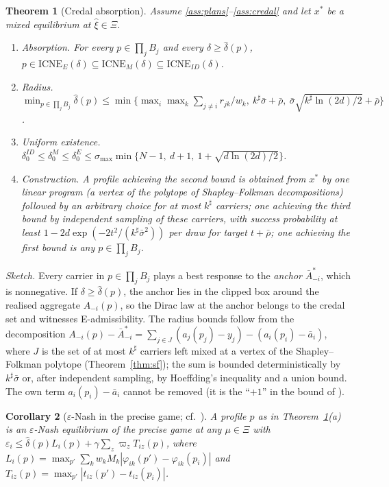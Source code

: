 \documentclass[preprint,11pt]{elsarticle}
\newtheorem{theorem}{Theorem}
\newtheorem{corollary}[theorem]{Corollary}
\theoremstyle{definition}
\theoremstyle{remark}
\newcommand{\abar}{\bar a}
\newcommand{\Abar}{\bar A}
\newcommand{\ICNE}{\mathrm{ICNE}}
\begin{document}
\begin{theorem}[Credal absorption]\label{thm:main}
Assume \ref{ass:plans}--\ref{ass:credal} and let $x^*$ be a mixed equilibrium at $\hat\xi\in\Xi$.
\begin{enumerate}[label=(\alph*),leftmargin=*]
\item \emph{Absorption.} For every $p\in\prod_jB_j$ and every $\delta\ge\hat\delta(p)$, $p\in\ICNE_E(\delta)\subseteq\ICNE_M(\delta)\subseteq\ICNE_{ID}(\delta)$.
\item \emph{Radius.} $\min_{p\in\prod_jB_j}\hat\delta(p)\le\min\big\{\max_i\max_k\sum_{j\ne i}r_{jk}/w_k,\ k^\sharp\bar\sigma+\bar\rho,\ \bar\sigma\sqrt{k^\sharp\ln(2d)/2}+\bar\rho\big\}$.
\item \emph{Uniform existence.} $\delta_0^{ID}\le\delta_0^M\le\delta_0^E\le\sigma_{\max}\min\{N-1,\ d+1,\ 1+\sqrt{d\ln(2d)/2}\}$.
\item \emph{Construction.} A profile achieving the second bound is obtained from $x^*$ by one linear program (a vertex of the polytope of Shapley--Folkman decompositions) followed by an arbitrary choice for at most $k^\sharp$ carriers; one achieving the third bound by independent sampling of these carriers, with success probability at least $1-2d\exp(-2t^2/(k^\sharp\bar\sigma^2))$ per draw for target $t+\bar\rho$; one achieving the first bound is any $p\in\prod_jB_j$.
\end{enumerate}
\end{theorem}

\emph{Sketch.} Every carrier in $p\in\prod_jB_j$ plays a best response to the \emph{anchor} $\Abar^*_{-i}$, which is nonnegative. If $\delta\ge\hat\delta(p)$, the anchor lies in the clipped box around the realised aggregate $A_{-i}(p)$, so the Dirac law at the anchor belongs to the credal set and witnesses E-admissibility. The radius bounds follow from the decomposition $A_{-i}(p)-\Abar^*_{-i}=\sum_{j\in J}(a_j(p_j)-y_j)-(a_i(p_i)-\abar_i)$, where $J$ is the set of at most $k^\sharp$ carriers left mixed at a vertex of the Shapley--Folkman polytope (Theorem~\ref{thm:sf}); the sum is bounded deterministically by $k^\sharp\bar\sigma$ or, after independent sampling, by Hoeffding's inequality \citep{Hoeffding1963} and a union bound. The own term $a_i(p_i)-\abar_i$ cannot be removed (it is the ``$+1$'' in the bound of \citealp{Liu2023}).

\begin{corollary}[$\varepsilon$-Nash in the precise game; cf.\ \citealp{Liu2023}]\label{cor:eps}
A profile $p$ as in Theorem~\ref{thm:main}(a) is an $\varepsilon$-Nash equilibrium of the precise game at any $\mu\in\Xi$ with $\varepsilon_i\le\hat\delta(p)L_i(p)+\gamma\sum_z\varpi_zT_{iz}(p)$, where $L_i(p)=\max_{p'}\sum_kw_kM_k|\varphi_{ik}(p')-\varphi_{ik}(p_i)|$ and $T_{iz}(p)=\max_{p'}|t_{iz}(p')-t_{iz}(p_i)|$.
\end{corollary}
\end{document}
